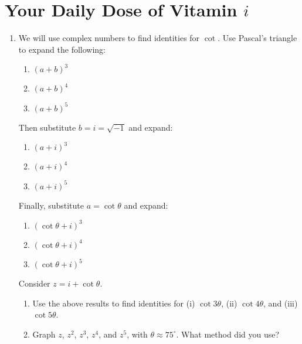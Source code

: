 \documentclass[../gatm.tex]{subfiles}
\begin{document}
\section{Your Daily Dose of Vitamin $i$}

\newcommand{\Arg} {\operatorname{Arg}}
\newcommand{\cis} {\operatorname{cis}}
\newcommand{\Real} {\operatorname{Re}}
\newcommand{\Imag} {\operatorname{Im}}


\begin{enumerate}
\item We will use complex numbers to find identities for $\cot$. Use Pascal's triangle to expand the following:
\begin{multicols}{3}
\begin{enumerate}
\item $(a+b)^3$
\item $(a+b)^4$
\item $(a+b)^5$
\setcounter{vit_i_problem_ii}{\value{enumii}}
\end{enumerate}
\end{multicols}
Then substitute $b=i=\sqrt{-1}$ and expand:
\begin{multicols}{3}
\begin{enumerate}
\setcounter{enumii}{\value{vit_i_problem_ii}}
\item $(a+i)^3$ %
\item $(a+i)^4$ %
\item $(a+i)^5$ %
\setcounter{vit_i_problem_ii}{\value{enumii}}
\end{enumerate}
\end{multicols}
Finally, substitute $a=\cot \theta$ and expand:
\begin{multicols}{3}
\begin{enumerate}
\setcounter{enumii}{\value{vit_i_problem_ii}}
\item $(\cot \theta +i)^3$ %
\item $(\cot \theta +i)^4$ %
\item $(\cot \theta +i)^5$ %
\setcounter{vit_i_problem_ii}{\value{enumii}}
\end{enumerate}
\end{multicols}
Consider $z=i+\cot\theta$.
\begin{enumerate}
\setcounter{enumii}{\value{vit_i_problem_ii}}
\item Use the above results to find identities for (i) $\cot 3\theta$, (ii) $\cot 4\theta$, and (iii) $\cot 5\theta$. %
\item Graph $z$, $z^2$, $z^3$, $z^4$, and $z^5$, with $\theta \approx 75^\circ$. What method did you use? %
\end{enumerate}


\end{enumerate}
\end{document}
